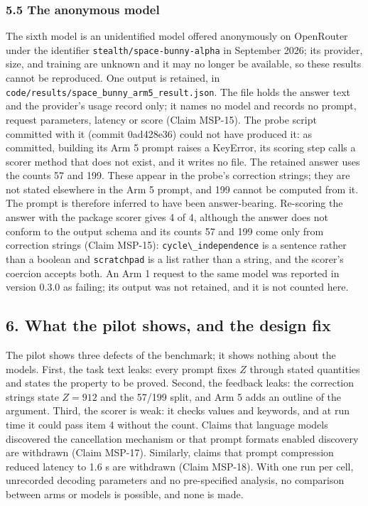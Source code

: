 \documentclass[
  11pt,
]{article}
\newcommand{\passthrough}[1]{#1}
\begin{document}
\subsubsection{5.5 The anonymous model}\label{the-anonymous-model}

The sixth model is an unidentified model offered anonymously on
OpenRouter under the identifier \nolinkurl{stealth/space-bunny-alpha} in
September 2026; its provider, size, and training are unknown and it may
no longer be available, so these results cannot be reproduced. One
output is retained, in
\nolinkurl{code/results/space_bunny_arm5_result.json}. The file holds
the answer text and the provider's usage record only; it names no model
and records no prompt, request parameters, latency or score (Claim
MSP-15). The probe script committed with it (commit 0ad428e36) could not
have produced it: as committed, building its Arm 5 prompt raises a
KeyError, its scoring step calls a scorer method that does not exist,
and it writes no file. The retained answer uses the counts 57 and 199.
These appear in the probe's correction strings; they are not stated
elsewhere in the Arm 5 prompt, and 199 cannot be computed from it. The
prompt is therefore inferred to have been answer-bearing. Re-scoring the
answer with the package scorer gives 4 of 4, although the answer does
not conform to the output schema and its counts 57 and 199 come only
from correction strings (Claim MSP-15):
\passthrough{\lstinline!cycle\_independence!} is a sentence rather than
a boolean and \passthrough{\lstinline!scratchpad!} is a list rather than
a string, and the scorer's coercion accepts both. An Arm 1 request to
the same model was reported in version 0.3.0 as failing; its output was
not retained, and it is not counted here.

\subsection{6. What the pilot shows, and the design
fix}\label{what-the-pilot-shows-and-the-design-fix}

The pilot shows three defects of the benchmark; it shows nothing about
the models. First, the task text leaks: every prompt fixes \(Z\) through
stated quantities and states the property to be proved. Second, the
feedback leaks: the correction strings state \(Z = 912\) and the 57/199
split, and Arm 5 adds an outline of the argument. Third, the scorer is
weak: it checks values and keywords, and at run time it could pass item
4 without the count. Claims that language models discovered the
cancellation mechanism or that prompt formats enabled discovery are
withdrawn (Claim MSP-17). Similarly, claims that prompt compression
reduced latency to 1.6 s are withdrawn (Claim MSP-18). With one run per
cell, unrecorded decoding parameters and no pre-specified analysis, no
comparison between arms or models is possible, and none is made.
\end{document}
